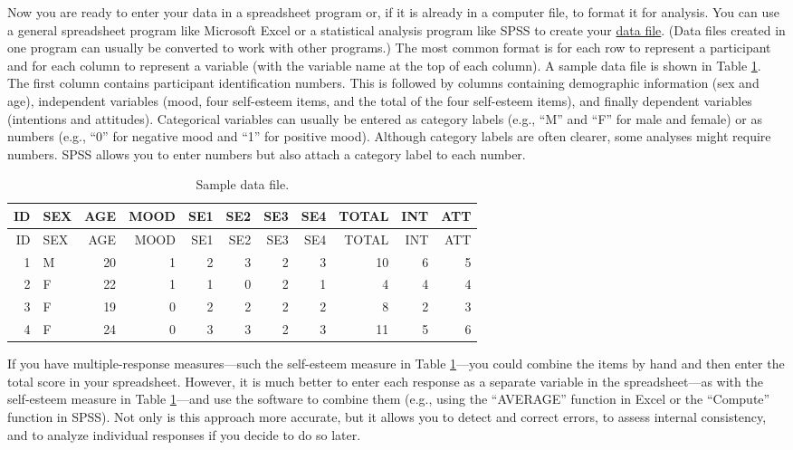 \documentclass[
]{krantz}
\begin{document}
Now you are ready to enter your data in a spreadsheet program or, if it is already in a computer file, to format it for analysis. You can use a general spreadsheet program like Microsoft Excel or a statistical analysis program like SPSS to create your \protect\hyperlink{data-file}{data file}. (Data files created in one program can usually be converted to work with other programs.) The most common format is for each row to represent a participant and for each column to represent a variable (with the variable name at the top of each column). A sample data file is shown in Table \ref{tab:sampledata}. The first column contains participant identification numbers. This is followed by columns containing demographic information (sex and age), independent variables (mood, four self-esteem items, and the total of the four self-esteem items), and finally dependent variables (intentions and attitudes). Categorical variables can usually be entered as category labels (e.g., ``M'' and ``F'' for male and female) or as numbers (e.g., ``0'' for negative mood and ``1'' for positive mood). Although category labels are often clearer, some analyses might require numbers. SPSS allows you to enter numbers but also attach a category label to each number.

\begin{longtable}[]{@{}rlrrrrrrrrr@{}}
\caption{\label{tab:sampledata} Sample data file.}\tabularnewline
\toprule()
ID & SEX & AGE & MOOD & SE1 & SE2 & SE3 & SE4 & TOTAL & INT & ATT \\
\midrule()
\endfirsthead
\toprule()
ID & SEX & AGE & MOOD & SE1 & SE2 & SE3 & SE4 & TOTAL & INT & ATT \\
\midrule()
\endhead
1 & M & 20 & 1 & 2 & 3 & 2 & 3 & 10 & 6 & 5 \\
2 & F & 22 & 1 & 1 & 0 & 2 & 1 & 4 & 4 & 4 \\
3 & F & 19 & 0 & 2 & 2 & 2 & 2 & 8 & 2 & 3 \\
4 & F & 24 & 0 & 3 & 3 & 2 & 3 & 11 & 5 & 6 \\
\bottomrule()
\end{longtable}

If you have multiple-response measures---such the self-esteem measure in Table \ref{tab:sampledata}---you could combine the items by hand and then enter the total score in your spreadsheet. However, it is much better to enter each response as a separate variable in the spreadsheet---as with the self-esteem measure in Table \ref{tab:sampledata}---and use the software to combine them (e.g., using the ``AVERAGE'' function in Excel or the ``Compute'' function in SPSS). Not only is this approach more accurate, but it allows you to detect and correct errors, to assess internal consistency, and to analyze individual responses if you decide to do so later.
\end{document}
